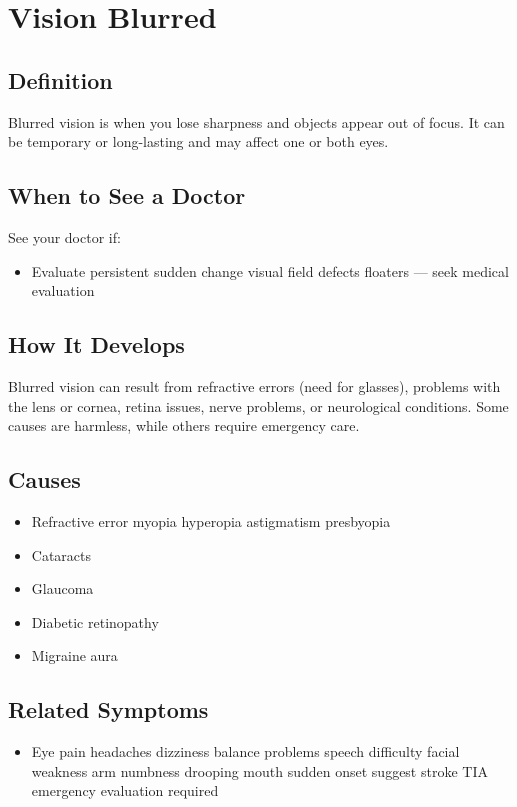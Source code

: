 \chapter{Vision Blurred}

\section*{Definition}
Blurred vision is when you lose sharpness and objects appear out of focus. It can be temporary or long-lasting and may affect one or both eyes.

\section*{When to See a Doctor}
See your doctor if:
\begin{itemize}
  \item Evaluate persistent sudden change visual field defects floaters — seek medical evaluation
\end{itemize}

\section*{How It Develops}
Blurred vision can result from refractive errors (need for glasses), problems with the lens or cornea, retina issues, nerve problems, or neurological conditions. Some causes are harmless, while others require emergency care.

\section*{Causes}
\begin{itemize}
  \item Refractive error myopia hyperopia astigmatism presbyopia
  \item Cataracts
  \item Glaucoma
  \item Diabetic retinopathy
  \item Migraine aura
\end{itemize}

\section*{Related Symptoms}
\begin{itemize}
  \item Eye pain headaches dizziness balance problems speech difficulty facial weakness arm numbness drooping mouth sudden onset suggest stroke TIA emergency evaluation required
\end{itemize}

